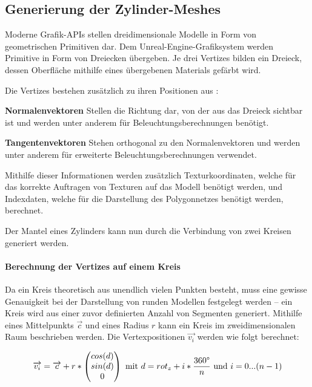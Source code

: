\subsection{Generierung der Zylinder-Meshes} \label{subsec:ZylinderMeshes}

Moderne Grafik-APIs stellen dreidimensionale Modelle in Form von geometrischen Primitiven dar. Dem Unreal-Engine-Grafiksystem werden Primitive in Form von Dreiecken übergeben. Je drei Vertizes bilden ein Dreieck, dessen Oberfläche mithilfe eines übergebenen Materials gefärbt wird.

Die Vertizes bestehen zusätzlich zu ihren Positionen aus :

\begin{description}
	\item \textbf{Normalenvektoren} Stellen die Richtung dar, von der aus das Dreieck sichtbar ist und werden unter anderem für Beleuchtungsberechnungen benötigt. \cite{ModelingByNumbers1A:13} 
	\item \textbf{Tangentenvektoren} Stehen orthogonal zu den Normalenvektoren und werden unter anderem für erweiterte Beleuchtungsberechnungen verwendet. \cite{ModelingByNumbers1A:13} 
\end{description}

Mithilfe dieser Informationen werden zusätzlich Texturkoordinaten, welche für das korrekte Auftragen von Texturen auf das Modell benötigt werden, und Indexdaten, welche für die Darstellung des Polygonnetzes benötigt werden, berechnet.

Der Mantel eines Zylinders kann nun durch die Verbindung von zwei Kreisen generiert werden. 

\paragraph{Berechnung der Vertizes auf einem Kreis}

Da ein Kreis theoretisch aus unendlich vielen Punkten besteht, muss eine gewisse Genauigkeit bei der Darstellung von runden Modellen festgelegt werden -- ein Kreis wird aus einer zuvor definierten Anzahl von Segmenten generiert. Mithilfe eines Mittelpunkts $\overrightarrow{c}$ und eines Radius $r$ kann ein Kreis im zweidimensionalen Raum beschrieben werden. Die Vertexpositionen $\overrightarrow{v_i}$ werden wie folgt berechnet:

\begin{equation}
	\overrightarrow{v_i} =\overrightarrow{c} + r * \begin{pmatrix}
	cos(d)\\
	sin(d)\\
	0
	\end{pmatrix}
	\text{ mit } d = rot_z + i * \frac{360\degree}{n} \text{ und } i = 0 ... (n-1)
\end{equation}
\cite{ModelingByNumbersZylindersA:13}

